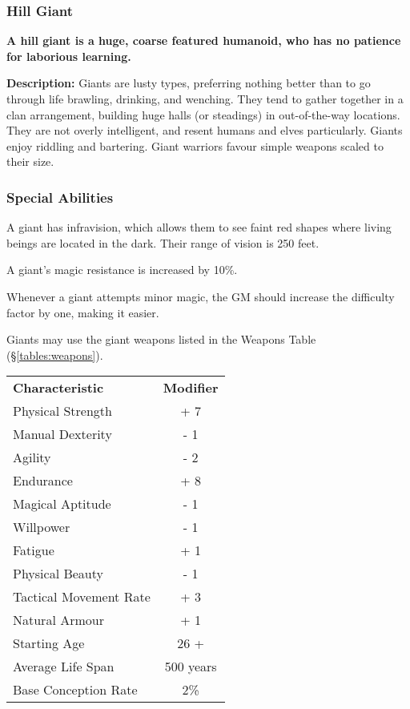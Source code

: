 \begin{multicols*}{3}
\subsubsection{Hill Giant}

\textbf{A hill giant is a huge, coarse featured humanoid, who has no
patience for laborious learning.}

\textbf{Description:} Giants are lusty types, preferring nothing
better than to go through life brawling, drinking, and wenching. They
tend to gather together in a clan arrangement, building huge halls (or
steadings) in out-of-the-way locations. They are not overly
intelligent, and resent humans and elves particularly. Giants enjoy
riddling and bartering. Giant warriors favour simple weapons scaled to
their size.

\subsubsection{Special Abilities}

\begin{Enumerate}
\item
A giant has infravision, which allows them to see faint red shapes
where living beings are located in the dark. Their range of vision is
250 feet.

\item
A giant's magic resistance is increased by 10\%.

\item
Whenever a giant attempts minor magic, the GM should increase the
difficulty factor by one, making it easier.

\item
Giants may use the giant weapons listed in the Weapons Table
(\S\ref{tables:weapons}).
\end{Enumerate}

\begin{tabularx}{\linewidth}{Xc}
\textbf{Characteristic} & \textbf{Modifier} \\
Physical Strength	& + 7 \\
Manual Dexterity	& - 1 \\
Agility			& - 2 \\
Endurance		& + 8 \\
Magical Aptitude	& - 1 \\
Willpower		& - 1 \\
Fatigue			& + 1 \\
Physical Beauty		& - 1 \\
Tactical Movement Rate	& + 3 \\
Natural Armour		& + 1 \\
Starting Age		& 26 + \\
Average Life Span	& 500 years \\
Base Conception Rate	& 2\% \\
\end{tabularx}


\end{multicols*}
